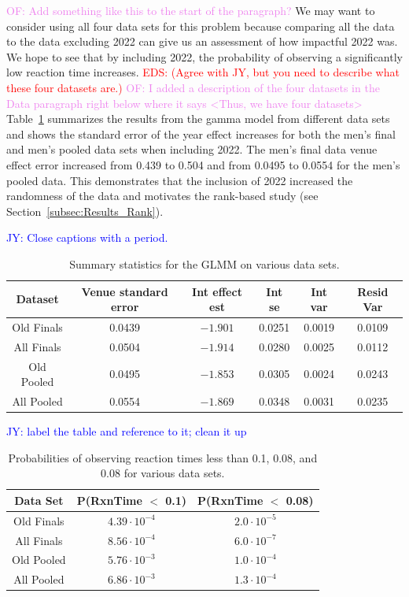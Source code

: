\documentclass[12pt, letterpaper, titlepage]{article}
\newcommand{\jy}[1]{\textcolor{blue}{JY: #1}}
\newcommand{\eds}[1]{\textcolor{red}{EDS: (#1)}}
\newcommand{\of}[1]{\textcolor{violet}{OF: #1}}
\begin{document}
\of{Add something like this to the start of the paragraph?}
We may want to consider using all four data sets for this problem because
comparing all the data to the data excluding 2022 can give us an
assessment of how impactful 2022 was. We hope to see that by including 2022,
the probability of observing a significantly low reaction time increases. 
\eds{Agree with JY, but you need to describe what these four datasets are.}
\of{I added a description of the four datasets in the Data paragraph right below
where it says <Thus, we have four datasets>}
Table~\ref{tab:Gamma_parameters} summarizes the results from the gamma model 
from different data sets and shows the standard error of the year
effect increases for both the men's final and men's pooled data sets when
including 2022.  The men's final data venue effect error increased from 0.439
to 0.504 and from 0.0495 to 0.0554 for the men's pooled data.  This demonstrates
that the inclusion of 2022 increased the randomness of the data and motivates
the rank-based study (see Section~\ref{subsec:Results_Rank}).

\jy{Close captions with a period.}
\begin{table}
  \centering
  \caption{Summary statistics for the GLMM on various data sets.} 
  \begin{tabular}{c c c c c c}
      \toprule
      Dataset & Venue standard error & Int effect est & Int se & Int var & Resid Var \\
      \midrule
      Old Finals & 0.0439 & $-1.901$ & 0.0251 & 0.0019 & 0.0109 \\
      All Finals & 0.0504 & $-1.914$ & 0.0280 & 0.0025 & 0.0112 \\
      Old Pooled & 0.0495 & $-1.853$ & 0.0305 & 0.0024 & 0.0243 \\
      All Pooled & 0.0554 & $-1.869$ & 0.0348 & 0.0031 & 0.0235 \\
      \bottomrule
  \end{tabular}
  \label{tab:Gamma_parameters}
\end{table}


\jy{label the table and reference to it; clean it up}
\begin{table}
  \centering
  \caption{Probabilities of observing reaction times less than 0.1, 0.08, and
  0.08 for various data sets.}
  \begin{tabular}{c c c} 
   \toprule
   Data Set & P(RxnTime $<$ 0.1) & P(RxnTime $<$ 0.08) \\ 
   \midrule
   Old Finals & $4.39\cdot10^{-4}$ & $2.0\cdot10^{-5}$ \\
   All Finals & $8.56\cdot10^{-4}$ & $6.0\cdot10^{-7}$ \\
   Old Pooled & $5.76\cdot10^{-3}$ & $1.0\cdot10^{-4}$ \\ 
   All Pooled & $6.86\cdot10^{-3}$ & $1.3\cdot10^{-4}$ \\
   \bottomrule
  \end{tabular}
  \label{tab:Sim_probability}
\end{table}
\end{document}
